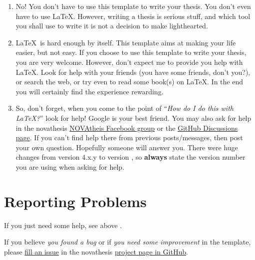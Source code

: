 \begin{enumerate}
  \item No! You don't have to use this template to write your thesis.  You don't even have to use \LaTeX.  However, writing a thesis is serious stuff, and which tool you shall use to write it is not a decision to make lighthearted.
  \item \LaTeX\ is hard enough by itself.  This template aims at making your life easier, but not easy. If you choose to use this template to write your thesis, you are very welcome.  However, don't expect me to provide you help with \LaTeX.  Look for help with your friends (you have some friends, don't you?), or search the web, or try even to read some book(s) on \LaTeX. In the end you will certainly find the experience rewarding.
  \item So, don't forget, when you come to the point of “\emph{How do I do this with \LaTeX?}” look for help!  Google is your best friend. You may also ask for help in the \gls{novathesis} \href{https://www.facebook.com/groups/novathesis}{NOVAtheis Facebook group} or the \href{https://github.com/joaomlourenco/novathesis/discussions}{GitHub Discussions page}.  If you can't find help there from previous posts/messages, then post your own question. Hopefully someone will answer you. There were huge changes from version 4.x.y to version \novathesisversion, so \textbf{always} state the version number you are using when asking for help.
\end{enumerate}

\begin{center}  
\end{center}
 

\section{Reporting Problems}
\label{sec:reporting_problems}

If you just need some help, see above .

If you believe \emph{you found a bug} or if \emph{you need some improvement} in the template, please \href{https://github.com/joaomlourenco/novathesis/issues}{fill an issue} in the \gls{novathesis} \href{https://github.com/joaomlourenco/novathesis/issues}{project page in GitHub}.


